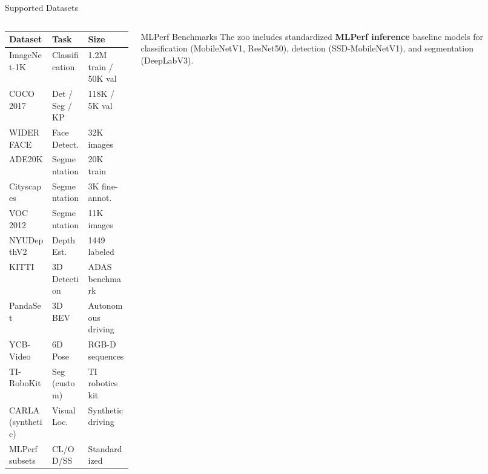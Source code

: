 \documentclass[aspectratio=169,12pt]{beamer}
\begin{document}
\begin{frame}{Supported Datasets}
  \begin{columns}[T]
    \begin{column}{0.50\textwidth}
      \footnotesize
      \begin{tabular}{p{2.8cm}lp{2.2cm}}
        \toprule
        \textbf{Dataset} & \textbf{Task} & \textbf{Size} \\
        \midrule
        \rowcolor{TIGray} ImageNet-1K & Classification & 1.2M train / 50K val \\
        COCO 2017 & Det / Seg / KP & 118K / 5K val \\
        \rowcolor{TIGray} WIDER FACE & Face Detect. & 32K images \\
        ADE20K & Segmentation & 20K train \\
        \rowcolor{TIGray} Cityscapes & Segmentation & 3K fine-annot. \\
        VOC 2012 & Segmentation & 11K images \\
        \rowcolor{TIGray} NYUDepthV2 & Depth Est. & 1449 labeled \\
        KITTI & 3D Detection & ADAS benchmark \\
        \rowcolor{TIGray} PandaSet & 3D BEV & Autonomous driving \\
        YCB-Video & 6D Pose & RGB-D sequences \\
        \rowcolor{TIGray} TI-RoboKit & Seg (custom) & TI robotics kit \\
        CARLA (synthetic) & Visual Loc. & Synthetic driving \\
        \rowcolor{TIGray} MLPerf subsets & CL/OD/SS & Standardized \\
        \bottomrule
      \end{tabular}
    \end{column}

    \begin{column}{0.46\textwidth}
      \vspace{0.1cm}
      \begin{exampleblock}{\scriptsize MLPerf Benchmarks}
        \scriptsize The zoo includes standardized \textbf{MLPerf inference}
        baseline models for classification (MobileNetV1, ResNet50),
        detection (SSD-MobileNetV1), and segmentation (DeepLabV3).
      \end{exampleblock}
    \end{column}
  \end{columns}
\end{frame}
\end{document}
